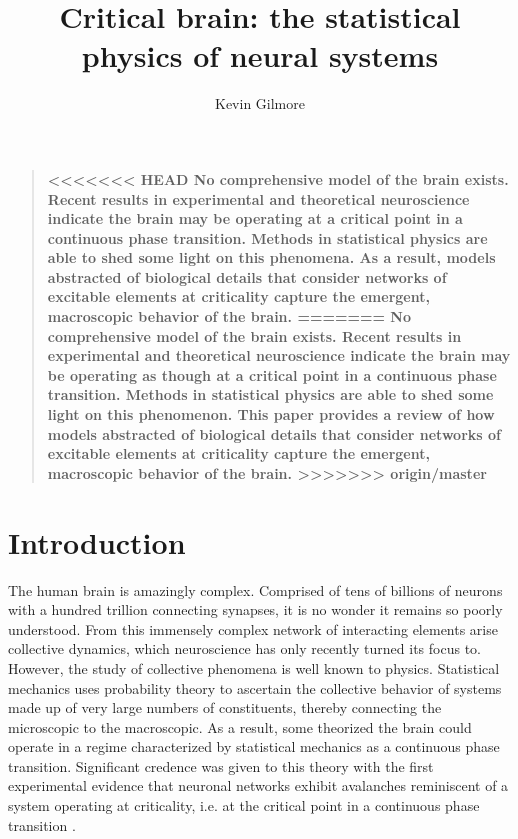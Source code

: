 \documentclass[12pt]{article}
\title{Critical brain: the statistical physics of neural systems}
\author
{Kevin Gilmore}
\newenvironment{sciabstract}{%
\begin{quote} \bf}
{\end{quote}}
\begin{document}
 


\baselineskip24pt


\maketitle 


\begin{sciabstract}
<<<<<<< HEAD
No comprehensive model of the brain exists. Recent results in experimental and theoretical neuroscience indicate the brain may be operating at a critical point in a continuous phase transition. Methods in statistical physics are able to shed some light on this phenomena. As a result, models abstracted of biological details that consider networks of excitable elements at criticality capture the emergent, macroscopic behavior of the brain.
=======
No comprehensive model of the brain exists. Recent results in experimental and theoretical neuroscience indicate the brain may be operating as though at a critical point in a continuous phase transition. Methods in statistical physics are able to shed some light on this phenomenon. This paper provides a review of how models abstracted of biological details that consider networks of excitable elements at criticality capture the emergent, macroscopic behavior of the brain.
>>>>>>> origin/master
\end{sciabstract}

\section*{Introduction}

The human brain is amazingly complex. Comprised of tens of billions of neurons with a hundred trillion connecting synapses, it is no wonder it remains so poorly understood. From this immensely complex network of interacting elements arise collective dynamics, which neuroscience has only recently turned its focus to. However, the study of collective phenomena is well known to physics. Statistical mechanics uses probability theory to ascertain the collective behavior of systems made up of very large numbers of constituents, thereby connecting the microscopic to the macroscopic. As a result, some theorized the brain could operate in a regime characterized by statistical mechanics as a continuous phase transition\cite{Bak1987a}. Significant credence was given to this theory with the first experimental evidence that neuronal networks exhibit avalanches reminiscent of a system operating at criticality, i.e. at the critical point in a continuous phase transition \cite{Beggs2003b}.
\end{document}
